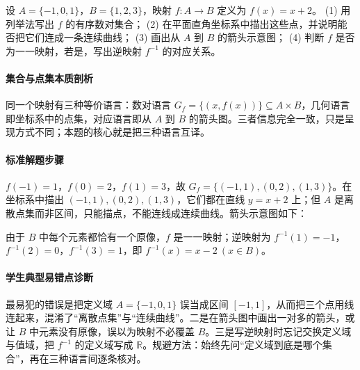 \begin{problem}
设 $A=\{-1,0,1\}$，$B=\{1,2,3\}$，映射 $f:A\to B$ 定义为 $f(x)=x+2$。
(1) 用列举法写出 $f$ 的有序数对集合；
(2) 在平面直角坐标系中描出这些点，并说明能否把它们连成一条连续曲线；
(3) 画出从 $A$ 到 $B$ 的箭头示意图；
(4) 判断 $f$ 是否为一一映射，若是，写出逆映射 $f^{-1}$ 的对应关系。
\end{problem}
\begin{solution}
\paragraph{集合与点集本质剖析}
同一个映射有三种等价语言：数对语言 $G_f=\{(x,f(x))\}\subseteq A\times B$，几何语言即坐标系中的点集，对应语言即从 $A$ 到 $B$ 的箭头图。三者信息完全一致，只是呈现方式不同；本题的核心就是把三种语言互译。
\paragraph{标准解题步骤}
$f(-1)=1$，$f(0)=2$，$f(1)=3$，故 $G_f=\{(-1,1),(0,2),(1,3)\}$。在坐标系中描出 $(-1,1),(0,2),(1,3)$，它们都在直线 $y=x+2$ 上；但 $A$ 是离散点集而非区间，只能描点，不能连线成连续曲线。箭头示意图如下：
\begin{center}
\end{center}
由于 $B$ 中每个元素都恰有一个原像，$f$ 是一一映射；逆映射为 $f^{-1}(1)=-1$，$f^{-1}(2)=0$，$f^{-1}(3)=1$，即 $f^{-1}(x)=x-2\ (x\in B)$。
\paragraph{学生典型易错点诊断}
最易犯的错误是把定义域 $A=\{-1,0,1\}$ 误当成区间 $[-1,1]$，从而把三个点用线连起来，混淆了“离散点集”与“连续曲线”。二是在箭头图中画出一对多的箭头，或让 $B$ 中元素没有原像，误以为映射不必覆盖 $B$。三是写逆映射时忘记交换定义域与值域，把 $f^{-1}$ 的定义域写成 $\mathbb{R}$。规避方法：始终先问“定义域到底是哪个集合”，再在三种语言间逐条核对。
\end{solution}

